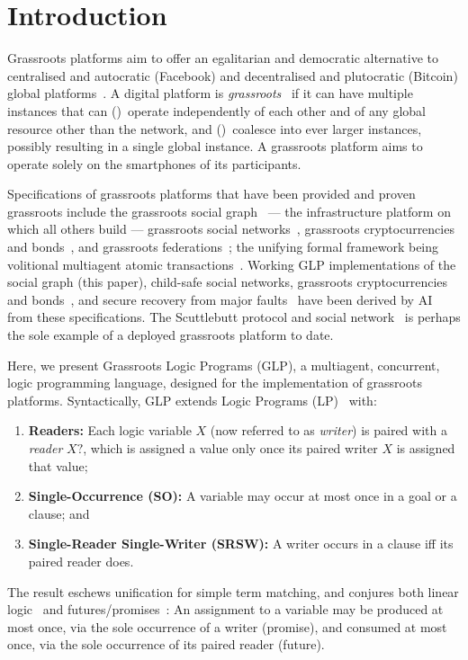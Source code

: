 \section{Introduction}

 Grassroots platforms aim to offer an egalitarian and democratic alternative to centralised and autocratic (Facebook) and decentralised and plutocratic (Bitcoin) global platforms~\cite{shapiro2025characterising}. A digital platform is \emph{grassroots}~\cite{shapiro2023grassrootsBA,shapiro2025atomic} if it can have multiple instances that can (\ia)~operate independently of each other and of any global resource other than the network, and (\ib)~coalesce into ever larger instances, possibly resulting in a single global instance.  A grassroots platform aims to operate solely on the smartphones of its participants.

Specifications of grassroots platforms that have been provided and proven grassroots include the grassroots social graph~\cite{shapiro2023gsn,shapiro2025atomic} --- the infrastructure platform on which all others build --- grassroots social networks~\cite{shapiro2023gsn}, grassroots cryptocurrencies and bonds~\cite{shapiro2024gc,lewis2023grassroots,shapiro2026bonds}, and grassroots federations~\cite{shapiro2025GF,halpern2024federated}; the unifying formal framework being volitional multiagent atomic transactions~\cite{lewis2026volitional}. Working GLP implementations of the social graph (this paper), child-safe social networks, grassroots cryptocurrencies and bonds~\cite{shapiro2026bonds}, and secure recovery from major faults~\cite{eitan2026securing} have been derived by AI from these specifications. The Scuttlebutt protocol and social network~\cite{kermarrec2020gossiping} is perhaps the sole example of a deployed grassroots platform to date.


 Here, we present Grassroots Logic Programs (GLP), a multiagent, concurrent, logic programming language, designed for the implementation of grassroots platforms. Syntactically, GLP extends Logic Programs (LP)~\cite{lloyd1987foundations} with:
\begin{enumerate}
    \item \textbf{Readers:} Each logic variable $X$ (now referred to as \emph{writer}) is paired with a \emph{reader} $X?$, which is assigned a value only once its paired writer $X$ is assigned that value; 
    \item  \textbf{Single-Occurrence (SO):} A variable may occur at most once in a goal or a clause; and
    \item \textbf{Single-Reader Single-Writer (SRSW):} A writer occurs in a clause iff its paired reader does.
\end{enumerate}
The result eschews unification for simple term matching, and conjures both linear logic~\cite{girard1987linear} and futures/promises~\cite{baker1977future,friedman1976impact}: An assignment to a variable may be produced at most once, via the sole occurrence of a writer (promise), and consumed at most once, via the sole occurrence of its paired reader (future).  

